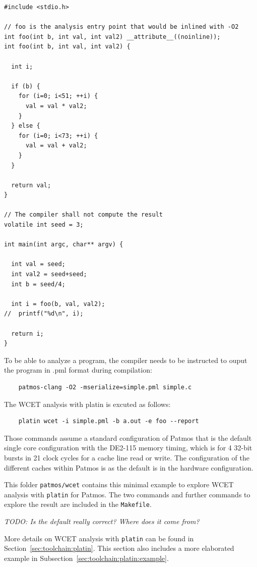 \documentclass[a4paper,fontsize=10pt,twoside,DIV15,BCOR12mm,headinclude=true,footinclude=false,pagesize,bibtotoc]{scrbook}
\newcommand{\code}[1]{{\texttt{#1}}}
\newcommand{\todo}[1]{{\emph{TODO: #1}}}
\begin{document}
\begin{verbatim}
#include <stdio.h>

// foo is the analysis entry point that would be inlined with -O2
int foo(int b, int val, int val2) __attribute__((noinline));
int foo(int b, int val, int val2) {

  int i;

  if (b) {
    for (i=0; i<51; ++i) {
      val = val * val2;
    }
  } else {
    for (i=0; i<73; ++i) {
      val = val + val2;
    }
  }

  return val;
}

// The compiler shall not compute the result
volatile int seed = 3;

int main(int argc, char** argv) {

  int val = seed;
  int val2 = seed+seed;
  int b = seed/4;

  int i = foo(b, val, val2);
//  printf("%d\n", i);

  return i;
}
\end{verbatim}



To be able to analyze a program, the compiler needs to be instructed to
ouput the program in .pml format during compilation:

\begin{verbatim}
    patmos-clang -O2 -mserialize=simple.pml simple.c
\end{verbatim}

The WCET analysis with platin is excuted as follows:

\begin{verbatim}
    platin wcet -i simple.pml -b a.out -e foo --report
\end{verbatim}


Those commands assume a standard configuration of Patmos that is
the default single core configuration with the DE2-115 memory timing,
which is for 4 32-bit bursts in 21
clock cycles for a cache line read or write. The configuration of the different
caches within Patmos is as the default is in the hardware configuration.

This folder \code{patmos/wcet} contains this minimal example to explore
WCET analysis with \code{platin} for Patmos.
The two commands and further commands to explore the result are
included in the \code{Makefile}.

\todo{Is the default really correct? Where does it come from?}

More details on WCET analysis with \code{platin} can be found in Section~\ref{sec:toolchain:platin}.
This section also includes a more elaborated example in
Subsection~\ref{sec:toolchain:platin:example}.
\end{document}
